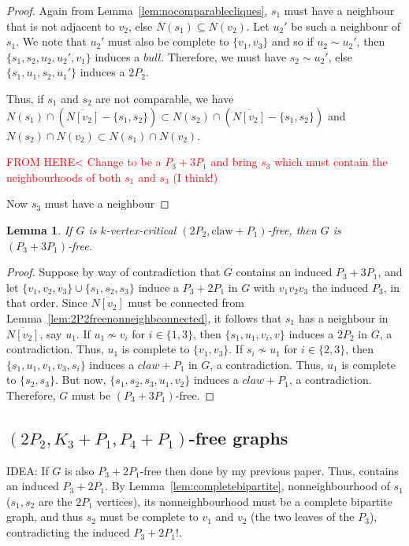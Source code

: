 \documentclass[11pt]{article}
\newtheorem{lemma}[theorem]{Lemma}
\theoremstyle{definition}
\newcommand{\forbid}{$(2P_2, K_3+P_1,P_4+P_1)$}
\begin{document}
\begin{proof}
Again from Lemma~\ref{lem:nocomparablecliques}, $s_1$ must have a neighbour that is not adjacent to $v_2$, else $N(s_1)\subseteq N(v_2)$. Let $u_2'$ be such a neighbour of $s_1$. We note that $u_2'$ must also be complete to $\{v_1,v_3\}$ and so if $u_2\sim u_2'$, then $\{s_1,s_2,u_2,u_2',v_1\}$ induces a $bull$. Therefore, we must have $s_2\sim u_2'$, else $\{s_1,u_1,s_2,u_1'\}$ induces a $2P_2$. 

Thus, if $s_1$ and $s_2$ are not comparable, we have $N(s_1)\cap (\overline{N[v_2]}-\{s_1,s_2\})\subset N(s_2)\cap (\overline{N[v_2]}-\{s_1,s_2\})$ and $N(s_2)\cap N(v_2)\subset N(s_1)\cap N(v_2)$.

\textcolor{red}{FROM HERE< Change to be a $P_3+3P_1$ and bring $s_3$ which must contain the neighbourhoods of both $s_1$ and $s_3$ (I think!)} 

Now $s_3$ must have a neighbour 




\end{proof}


\begin{lemma}
If $G$ is $k$-vertex-critical $(2P_2,\text{claw}+P_1)$-free, then $G$ is $(P_3+3 P_1)$-free.
\end{lemma}
\begin{proof}
Suppose by way of contradiction that $G$ contains an induced $P_3+3 P_1$, and let $\{v_1,v_2,v_3\}\cup \{s_1,s_2,s_3\}$ induce a $P_3+2 P_1$ in $G$ with $v_1v_2v_3$ the induced $P_3$, in that order. Since $\overline{N[v_2]}$ must be connected from Lemma~\ref{lem:2P2freenonneighbconnected}, it follows that $s_1$ has a neighbour in $\overline{N[v_2]}$, say $u_1$. If $u_1\nsim v_i$ for $i\in \{1,3\}$, then $\{s_1,u_1,v_i,v\}$ induces a $2P_2$ in $G$, a contradiction. Thus, $u_1$ is complete to $\{v_1,v_3\}$. If $s_i\nsim u_1$ for $i\in\{2,3\}$, then $\{s_1,u_1,v_1,v_3,s_i\}$ induces a $claw+P_1$ in $G$, a contradiction. Thus, $u_1$ is complete to $\{s_2,s_3\}$. But now, $\{s_1,s_2,s_3,u_1,v_2\}$ induces a $claw+P_1$, a contradiction. Therefore, $G$ must be $(P_3+3 P_1)$-free.
\end{proof}



\subsection{\forbid-free graphs}

IDEA: If $G$ is also $P_3+2P_1$-free then done by my previous paper. Thus, contains an induced $P_3+2P_1$. By Lemma~\ref{lem:completebipartite}, nonneighbourhood of $s_1$ ($s_1,s_2$ are the $2P_1$ vertices), its nonneighbourhood must be a complete bipartite graph, and thus $s_2$ must be complete to $v_1$ and $v_2$ (the two leaves of the $P_3$), contradicting the induced $P_3+2P_1$!. 
\end{document}
